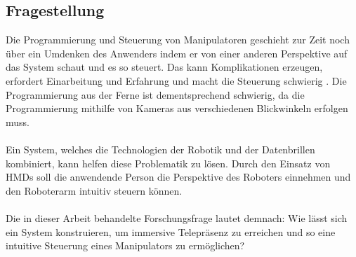 \subsection{Fragestellung}
  Die Programmierung und Steuerung von Manipulatoren geschieht zur Zeit noch über ein Umdenken des Anwenders indem er von einer anderen Perspektive auf das System schaut und es so steuert. Das kann Komplikationen erzeugen, erfordert Einarbeitung und Erfahrung und macht die Steuerung schwierig \cite[S.190]{ehlers_echtzeitfahige_2019}. Die Programmierung aus der Ferne ist dementsprechend schwierig, da die Programmierung mithilfe von Kameras aus verschiedenen Blickwinkeln erfolgen muss.\\\\
  Ein System, welches die Technologien der Robotik und der Datenbrillen kombiniert, kann helfen diese Problematik zu lösen. Durch den Einsatz von HMDs soll die anwendende Person die Perspektive des Roboters einnehmen und den Roboterarm intuitiv steuern können. \\\\
  Die in dieser Arbeit behandelte Forschungsfrage lautet demnach: Wie lässt sich ein System konstruieren, um immersive Telepräsenz zu erreichen und so eine intuitive Steuerung eines Manipulators zu ermöglichen?
